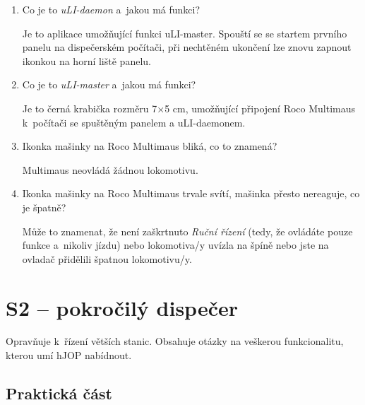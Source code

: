 \documentclass[12pt,a4paper]{article}
\def\solution#1{\ifsolution \par{\color{gray}#1}\fi}
\begin{document}
\begin{enumerate}[leftmargin=*]

\item Co je to \textit{uLI-daemon} a~jakou má funkci?
\solution{Je to aplikace umožňující funkci uLI-master. Spouští se se startem
prvního panelu na dispečerském počítači, při nechtěném ukončení lze znovu
zapnout ikonkou na horní liště panelu.}

\item Co je to \textit{uLI-master} a~jakou má funkci?
\solution{Je to černá krabička rozměru 7×5 cm, umožňující připojení Roco
Multimaus k~počítači se spuštěným panelem a uLI-daemonem.}

\item Ikonka mašinky na Roco Multimaus bliká, co to znamená?
\solution{Multimaus neovládá žádnou lokomotivu.}

\item Ikonka mašinky na Roco Multimaus trvale svítí, mašinka přesto nereaguje,
co je špatně?
\solution{Může to znamenat, že není zaškrtnuto \textit{Ruční řízení} (tedy, že
ovládáte pouze funkce a~nikoliv jízdu) nebo lokomotiva/y uvízla na špíně nebo
jste na ovladač přidělili špatnou lokomotivu/y.}

\end{enumerate}


\newpage
\section{S2 – pokročilý dispečer}

Opravňuje k~řízení větších stanic. Obsahuje otázky na veškerou funkcionalitu,
kterou umí hJOP nabídnout.

\subsection{Praktická část}
\end{document}
